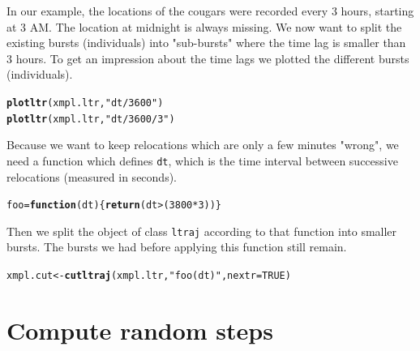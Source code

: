 \documentclass[11pt, a4paper]{article}\usepackage[]{graphicx}\usepackage[]{color}
\makeatletter
\newcommand{\hlnum}[1]{\textcolor[rgb]{0.686,0.059,0.569}{#1}}%
\newcommand{\hlstr}[1]{\textcolor[rgb]{0.192,0.494,0.8}{#1}}%
\newcommand{\hlopt}[1]{\textcolor[rgb]{0,0,0}{#1}}%
\newcommand{\hlstd}[1]{\textcolor[rgb]{0.345,0.345,0.345}{#1}}%
\newcommand{\hlkwa}[1]{\textcolor[rgb]{0.161,0.373,0.58}{\textbf{#1}}}%
\newcommand{\hlkwb}[1]{\textcolor[rgb]{0.69,0.353,0.396}{#1}}%
\newcommand{\hlkwc}[1]{\textcolor[rgb]{0.333,0.667,0.333}{#1}}%
\newcommand{\hlkwd}[1]{\textcolor[rgb]{0.737,0.353,0.396}{\textbf{#1}}}%
\newenvironment{kframe}{%
 \def\at@end@of@kframe{}%
 \ifinner\ifhmode%
  \def\at@end@of@kframe{\end{minipage}}%
  \begin{minipage}{\columnwidth}%
 \fi\fi%
 \def\FrameCommand##1{\hskip\@totalleftmargin \hskip-\fboxsep
 \colorbox{shadecolor}{##1}\hskip-\fboxsep
     \hskip-\linewidth \hskip-\@totalleftmargin \hskip\columnwidth}%
 \MakeFramed {\advance\hsize-\width
   \@totalleftmargin\z@ \linewidth\hsize
   \@setminipage}}%
 {\par\unskip\endMakeFramed%
 \at@end@of@kframe}
\newenvironment{knitrout}{}{} %
\makeatother
\begin{document}
In our example, the locations of the cougars were recorded every 3 hours, starting at 3 AM. The location at midnight is always missing. We now want to split the existing bursts (individuals) into "sub-bursts" where the time lag is smaller than 3 hours. To get an impression about the time lags we plotted the different bursts (individuals).

\begin{knitrout}
\color{fgcolor}\begin{kframe}
\begin{alltt}
\hlkwd{plotltr}\hlstd{(xmpl.ltr,} \hlstr{"dt/3600"}\hlstd{)}
\hlkwd{plotltr}\hlstd{(xmpl.ltr,} \hlstr{"dt/3600/3"}\hlstd{)}
\end{alltt}
\end{kframe}
\end{knitrout}

Because we want to keep relocations which are only a few minutes "wrong", we need a function which defines \texttt{dt}, which is the time interval between successive relocations (measured in seconds).

\begin{knitrout}
\color{fgcolor}\begin{kframe}
\begin{alltt}
\hlstd{foo} \hlkwb{=} \hlkwa{function}\hlstd{(}\hlkwc{dt}\hlstd{) \{}\hlkwd{return}\hlstd{(dt}\hlopt{>} \hlstd{(}\hlnum{3800}\hlopt{*}\hlnum{3}\hlstd{))\}}
\end{alltt}
\end{kframe}
\end{knitrout}

Then we split the object of class \texttt{ltraj} according to that function into smaller bursts. The bursts we had before applying this function still remain.

\begin{knitrout}
\color{fgcolor}\begin{kframe}
\begin{alltt}
\hlstd{xmpl.cut} \hlkwb{<-} \hlkwd{cutltraj}\hlstd{(xmpl.ltr,} \hlstr{"foo(dt)"}\hlstd{,} \hlkwc{nextr} \hlstd{=} \hlnum{TRUE}\hlstd{)}
\end{alltt}
\end{kframe}
\end{knitrout}


\section{Compute random steps}
\end{document}
